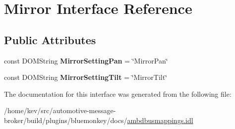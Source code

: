 \hypertarget{interfaceMirror}{\section{Mirror Interface Reference}
\label{interfaceMirror}
}
\subsection*{Public Attributes}
\begin{DoxyCompactItemize}
\item 
\hypertarget{interfaceMirror_a88e4f431f7abd6575f9d431ff0eb5f29}{const D\+O\+M\+String {\bfseries Mirror\+Setting\+Pan} = \char`\"{}Mirror\+Pan\char`\"{}}\label{interfaceMirror_a88e4f431f7abd6575f9d431ff0eb5f29}

\item 
\hypertarget{interfaceMirror_a8da36eb05f17b5d1517327968e9bdbe0}{const D\+O\+M\+String {\bfseries Mirror\+Setting\+Tilt} = \char`\"{}Mirror\+Tilt\char`\"{}}\label{interfaceMirror_a8da36eb05f17b5d1517327968e9bdbe0}

\end{DoxyCompactItemize}


The documentation for this interface was generated from the following file\+:\begin{DoxyCompactItemize}
\item 
/home/kev/src/automotive-\/message-\/broker/build/plugins/bluemonkey/docs/\hyperlink{ambdbusmappings_8idl}{ambdbusmappings.\+idl}\end{DoxyCompactItemize}
